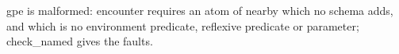 gpe
is malformed:
encounter
requires an atom of
nearby
which no schema adds, and which is no environment predicate, reflexive predicate or parameter;
check_named gives the faults.
